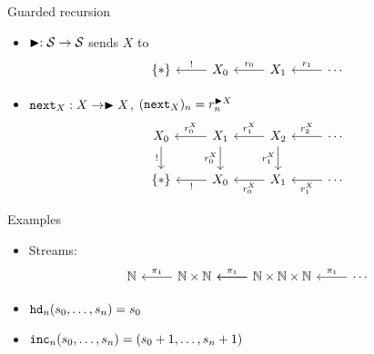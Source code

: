 \documentclass{beamer}
\begin{document}
\begin{frame}[fragile]{Guarded recursion}
\begin{itemize}
    \item $\blacktriangleright : \mathcal{S} \to \mathcal{S}$ sends $X$ to
    \[\begin{tikzcd}
    	{\{*\}} & {X_0} & {X_1} & \cdots
    	\arrow["{!}"', from=1-2, to=1-1]
    	\arrow["{r_0}"', from=1-3, to=1-2]
    	\arrow["{r_1}"', from=1-4, to=1-3]
    \end{tikzcd}\]
    \item $\mathtt{next}_X : X \to \blacktriangleright{X}$, $(\mathtt{next}_X)_n = r^{\blacktriangleright{X}}_n$
    \[\begin{tikzcd}
    	{X_0} & {X_1} & {X_2} & \cdots \\
    	{\{*\}} & {X_0} & {X_1} & \cdots
    	\arrow["{r^X_0}"', from=1-2, to=1-1]
    	\arrow["{r^X_1}"', from=1-3, to=1-2]
    	\arrow["{r^X_2}"', from=1-4, to=1-3]
    	\arrow["{r^X_0}", from=2-3, to=2-2]
    	\arrow["{r^X_1}", from=2-4, to=2-3]
    	\arrow["{!}"', from=1-1, to=2-1]
    	\arrow["{!}", from=2-2, to=2-1]
    	\arrow["{r^X_0}"', from=1-2, to=2-2]
    	\arrow["{r^X_1}"', from=1-3, to=2-3]
    \end{tikzcd}\]
\end{itemize}
\end{frame}

\begin{frame}[fragile]{Examples}
\begin{itemize}
    \item Streams:
    \[\begin{tikzcd}
    	\N & {\N \times \N} & {\N \times \N \times \N} & \cdots
    	\arrow["{\pi_1}"', from=1-2, to=1-1]
    	\arrow[from=1-3, to=1-2]
    	\arrow["{\pi_1}"', from=1-3, to=1-2]
    	\arrow["{\pi_1}"', from=1-4, to=1-3]
    \end{tikzcd}\]
    \item $\mathtt{hd}_n(s_0, \ldots, s_n) = s_0$
    \item $\mathtt{inc}_n(s_0, \ldots, s_n) = (s_0 + 1, \ldots, s_n + 1)$
\end{itemize}
\end{frame}
\end{document}
